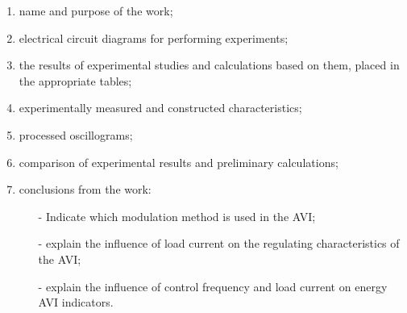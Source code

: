 \documentclass[a4paper,14pt]{article}
\begin{document}
\begin{enumerate}
\item name and purpose of the work;

\item electrical circuit diagrams for performing experiments;

\item the results of experimental studies and calculations based on them, placed in the appropriate tables;

\item experimentally measured and constructed characteristics;

\item processed oscillograms;

\item comparison of experimental results and preliminary calculations;

\item conclusions from the work:

\begin{itemize}
\item[-] Indicate which modulation method is used in the AVI;

\item[-] explain the influence of load current on the regulating characteristics of the AVI;

\item[-] explain the influence of control frequency and load current on energy AVI indicators.
\end{itemize}
\end{enumerate}
\end{document}
